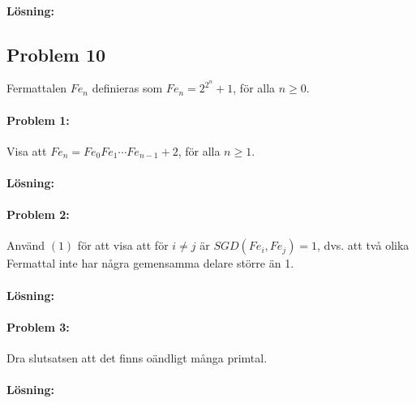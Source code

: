 \documentclass[12pt]{article}
\begin{document}
\paragraph{Lösning:}


\newpage\noindent\subsection*{Problem 10}
Fermattalen $Fe_n$ definieras som $Fe_n=2^{2^n}+1$, för alla $n\ge 0$.
\paragraph{Problem 1:} Visa att $Fe_n=Fe_0Fe_1\cdots Fe_{n-1}+2$, för alla $n\ge 1$.

\paragraph{Lösning:}


\paragraph{Problem 2:} Använd $(1)$ för att visa att för $i\ne j$ är $SGD(Fe_i, Fe_j)=1$, dvs. att två olika Fermattal inte har några gemensamma delare större än 1.

\paragraph{Lösning:}


\paragraph{Problem 3:} Dra slutsatsen att det finns oändligt många primtal.

\paragraph{Lösning:}
\end{document}
